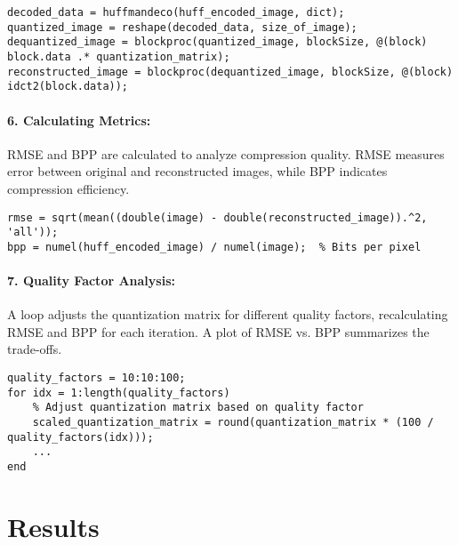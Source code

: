 \documentclass{article}
\begin{document}
\begin{lstlisting}[caption=Reconstruction]
decoded_data = huffmandeco(huff_encoded_image, dict);
quantized_image = reshape(decoded_data, size_of_image);
dequantized_image = blockproc(quantized_image, blockSize, @(block) block.data .* quantization_matrix);
reconstructed_image = blockproc(dequantized_image, blockSize, @(block) idct2(block.data));
\end{lstlisting}

\paragraph{6. Calculating Metrics:}
RMSE and BPP are calculated to analyze compression quality. RMSE measures error between original and reconstructed images, while BPP indicates compression efficiency.

\begin{lstlisting}[caption=Metrics Calculation]
rmse = sqrt(mean((double(image) - double(reconstructed_image)).^2, 'all'));
bpp = numel(huff_encoded_image) / numel(image);  % Bits per pixel
\end{lstlisting}

\paragraph{7. Quality Factor Analysis:}
A loop adjusts the quantization matrix for different quality factors, recalculating RMSE and BPP for each iteration. A plot of RMSE vs. BPP summarizes the trade-offs.

\begin{lstlisting}[caption=Quality Factor Analysis]
quality_factors = 10:10:100;
for idx = 1:length(quality_factors)
    % Adjust quantization matrix based on quality factor
    scaled_quantization_matrix = round(quantization_matrix * (100 / quality_factors(idx)));
    ...
end
\end{lstlisting}

\section{Results}

\newpage
\end{document}
